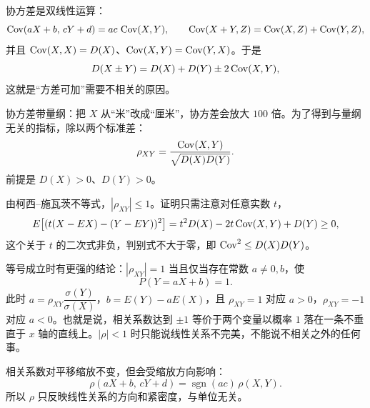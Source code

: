 协方差是双线性运算：
\[
\operatorname{Cov}(aX+b,\,cY+d)=ac\,\operatorname{Cov}(X,Y),\qquad
\operatorname{Cov}(X+Y,Z)=\operatorname{Cov}(X,Z)+\operatorname{Cov}(Y,Z),
\]
并且 $\operatorname{Cov}(X,X)=D(X)$、$\operatorname{Cov}(X,Y)=\operatorname{Cov}(Y,X)$。于是
\[
D(X\pm Y)=D(X)+D(Y)\pm2\operatorname{Cov}(X,Y),
\]
这就是“方差可加”需要不相关的原因。

协方差带量纲：把 $X$ 从“米”改成“厘米”，协方差会放大 $100$ 倍。为了得到与量纲无关的指标，除以两个标准差：
\[
\rho_{XY}=\frac{\operatorname{Cov}(X,Y)}{\sqrt{D(X)D(Y)}}.
\]
前提是 $D(X)>0$、$D(Y)>0$。

由柯西--施瓦茨不等式，$|\rho_{XY}|\le1$。证明只需注意对任意实数 $t$，
\[
E\bigl[(t(X-E X)-(Y-E Y))^2\bigr]
=t^2D(X)-2t\operatorname{Cov}(X,Y)+D(Y)\ge0,
\]
这个关于 $t$ 的二次式非负，判别式不大于零，即 $\operatorname{Cov}^2\le D(X)D(Y)$。

等号成立时有更强的结论：$|\rho_{XY}|=1$ 当且仅当存在常数 $a\ne0,b$，使
\[
P(Y=aX+b)=1 .
\]
此时 $a=\rho_{XY}\dfrac{\sigma(Y)}{\sigma(X)}$，$b=E(Y)-aE(X)$，且 $\rho_{XY}=1$ 对应 $a>0$，$\rho_{XY}=-1$ 对应 $a<0$。也就是说，相关系数达到 $\pm1$ 等价于两个变量以概率 $1$ 落在一条不垂直于 $x$ 轴的直线上。$|\rho|<1$ 时只能说线性关系不完美，不能说不相关之外的任何事。

相关系数对平移缩放不变，但会受缩放方向影响：
\[
\rho(aX+b,\,cY+d)=\operatorname{sgn}(ac)\,\rho(X,Y).
\]
所以 $\rho$ 只反映线性关系的方向和紧密度，与单位无关。

